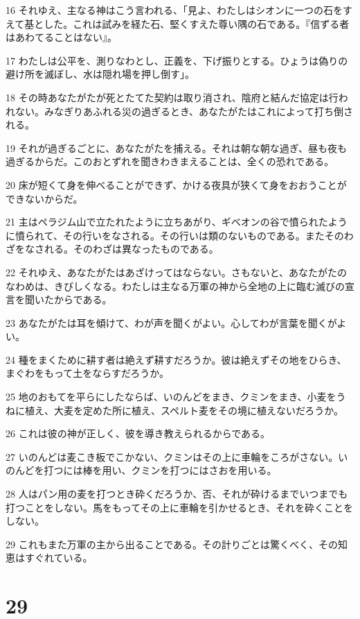 \par 16 それゆえ、主なる神はこう言われる、「見よ、わたしはシオンに一つの石をすえて基とした。これは試みを経た石、堅くすえた尊い隅の石である。『信ずる者はあわてることはない』。
\par 17 わたしは公平を、測りなわとし、正義を、下げ振りとする。ひょうは偽りの避け所を滅ぼし、水は隠れ場を押し倒す」。
\par 18 その時あなたがたが死とたてた契約は取り消され、陰府と結んだ協定は行われない。みなぎりあふれる災の過ぎるとき、あなたがたはこれによって打ち倒される。
\par 19 それが過ぎるごとに、あなたがたを捕える。それは朝な朝な過ぎ、昼も夜も過ぎるからだ。このおとずれを聞きわきまえることは、全くの恐れである。
\par 20 床が短くて身を伸べることができず、かける夜具が狭くて身をおおうことができないからだ。
\par 21 主はペラジム山で立たれたように立ちあがり、ギベオンの谷で憤られたように憤られて、その行いをなされる。その行いは類のないものである。またそのわざをなされる。そのわざは異なったものである。
\par 22 それゆえ、あなたがたはあざけってはならない。さもないと、あなたがたのなわめは、きびしくなる。わたしは主なる万軍の神から全地の上に臨む滅びの宣言を聞いたからである。
\par 23 あなたがたは耳を傾けて、わが声を聞くがよい。心してわが言葉を聞くがよい。
\par 24 種をまくために耕す者は絶えず耕すだろうか。彼は絶えずその地をひらき、まぐわをもって土をならすだろうか。
\par 25 地のおもてを平らにしたならば、いのんどをまき、クミンをまき、小麦をうねに植え、大麦を定めた所に植え、スペルト麦をその境に植えないだろうか。
\par 26 これは彼の神が正しく、彼を導き教えられるからである。
\par 27 いのんどは麦こき板でこかない、クミンはその上に車輪をころがさない。いのんどを打つには棒を用い、クミンを打つにはさおを用いる。
\par 28 人はパン用の麦を打つとき砕くだろうか、否、それが砕けるまでいつまでも打つことをしない。馬をもってその上に車輪を引かせるとき、それを砕くことをしない。
\par 29 これもまた万軍の主から出ることである。その計りごとは驚くべく、その知恵はすぐれている。

\chapter{29}

